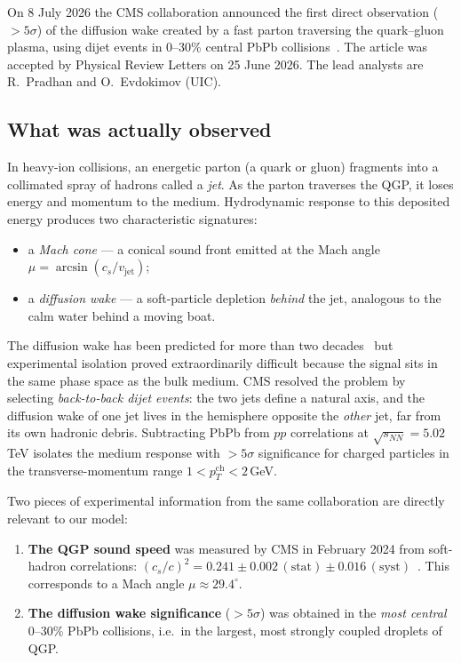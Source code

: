 \documentclass[11pt,a4paper]{article}
\theoremstyle{plain}
\theoremstyle{definition}
\theoremstyle{remark}
\begin{document}
\begin{keyfind}
On 8 July 2026 the CMS collaboration announced the first direct
observation ($>5\sigma$) of the diffusion wake created by a fast parton
traversing the quark--gluon plasma, using dijet events in 0--30\%
central PbPb collisions~\cite{cmsHIN2512}.  The article was accepted by
Physical Review Letters on 25 June 2026.  The lead analysts are
R.~Pradhan and O.~Evdokimov (UIC).
\end{keyfind}

\subsection{What was actually observed}
\label{sec:cms-observation}

In heavy-ion collisions, an energetic parton (a quark or gluon)
fragments into a collimated spray of hadrons called a \emph{jet}.  As
the parton traverses the QGP, it loses energy and momentum to the
medium.  Hydrodynamic response to this deposited energy produces two
characteristic signatures:
\begin{itemize}[leftmargin=2em,itemsep=2pt]
  \item a \emph{Mach cone} --- a conical sound front emitted at the
        Mach angle $\mu = \arcsin(c_s / v_{\mathrm{jet}})$;
  \item a \emph{diffusion wake} --- a soft-particle depletion
        \emph{behind} the jet, analogous to the calm water behind a
        moving boat.
\end{itemize}
The diffusion wake has been predicted for more than two
decades~\cite{casalderreyShuryakTeaney} but experimental isolation
proved extraordinarily difficult because the signal sits in the same
phase space as the bulk medium.  CMS resolved the problem by selecting
\emph{back-to-back dijet events}: the two jets define a natural axis,
and the diffusion wake of one jet lives in the hemisphere opposite the
\emph{other} jet, far from its own hadronic debris.  Subtracting
PbPb from $pp$ correlations at $\sqrt{s_{NN}} = 5.02\,$TeV isolates the
medium response with $>5\sigma$ significance for charged particles in
the transverse-momentum range $1 < p_T^{\mathrm{ch}} < 2\,$GeV.

Two pieces of experimental information from the same collaboration are
directly relevant to our model:
\begin{enumerate}[leftmargin=2em,itemsep=2pt]
  \item \textbf{The QGP sound speed} was measured by CMS in February
        2024 from soft-hadron correlations: $(c_s/c)^2 = 0.241 \pm
        0.002\,(\mathrm{stat}) \pm 0.016\,(\mathrm{syst})$~\cite{cmsSound2024}.
        This corresponds to a Mach angle $\mu \approx 29.4^\circ$.
  \item \textbf{The diffusion wake significance} ($>5\sigma$) was
        obtained in the \emph{most central} 0--30\% PbPb collisions,
        i.e.\ in the largest, most strongly coupled droplets of QGP.
\end{enumerate}
\end{document}
